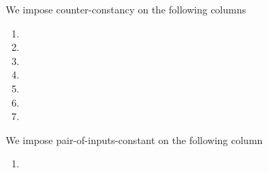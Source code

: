 We impose counter-constancy on the following columns
\begin{multicols}{3}
    \begin{enumerate}
        \item \maxCt{}
        \item \isInfinity{}
        \item \accInputs{}
        \item \nontrivialPairOfPointsAcc{}
        \item \membershipTestRequired{}
        \item \malformedDataExternalBit{}
        \item \malformedDataExternalAcc{}
    \end{enumerate}
\end{multicols}
We impose pair-of-inputs-constant on the following column
\begin{multicols}{3}
    \begin{enumerate}
        \item \nontrivialPairOfPointsBit{}
    \end{enumerate}
\end{multicols}
